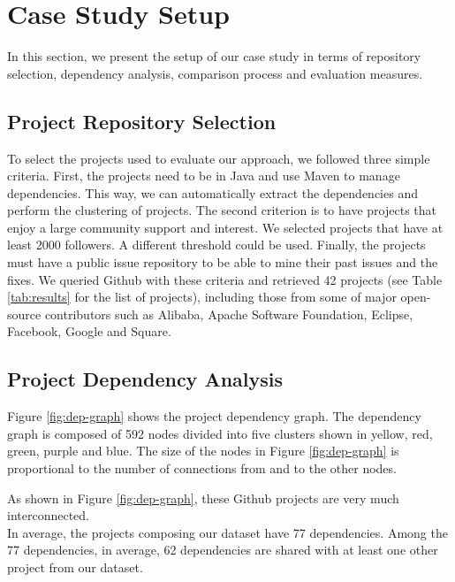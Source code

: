 \documentclass[conference]{IEEEtran}
\begin{document}
\section{Case Study Setup}\label{sec:exp}

In this section, we present the setup of our case study in terms of
repository selection, dependency analysis, comparison process and
evaluation measures.

\subsection{Project Repository Selection}\label{sec:rep}

To select the projects used to evaluate our approach, we followed three
simple criteria. First, the projects need to be in Java and use Maven to
manage dependencies. This way, we can automatically extract the
dependencies and perform the clustering of projects. The second
criterion is to have projects that enjoy a large community support and
interest. We selected projects that have at least 2000 followers. A
different threshold could be used. Finally, the projects must have a
public issue repository to be able to mine their past issues and the
fixes. We queried Github with these criteria and retrieved 42 projects
(see Table \ref{tab:results} for the list of projects), including those
from some of major open-source contributors such as Alibaba, Apache
Software Foundation, Eclipse, Facebook, Google and Square.

\subsection{Project Dependency Analysis}\label{sec:dependencies}

Figure \ref{fig:dep-graph} shows the project dependency graph. The
dependency graph is composed of 592 nodes divided into five clusters
shown in yellow, red, green, purple and blue. The size of the nodes in
Figure \ref{fig:dep-graph} is proportional to the number of connections
from and to the other nodes.



As shown in Figure \ref{fig:dep-graph}, these Github projects are very
much interconnected.\\In average, the projects composing our dataset
have 77 dependencies. Among the 77 dependencies, in average, 62
dependencies are shared with at least one other project from our
dataset.
\end{document}
